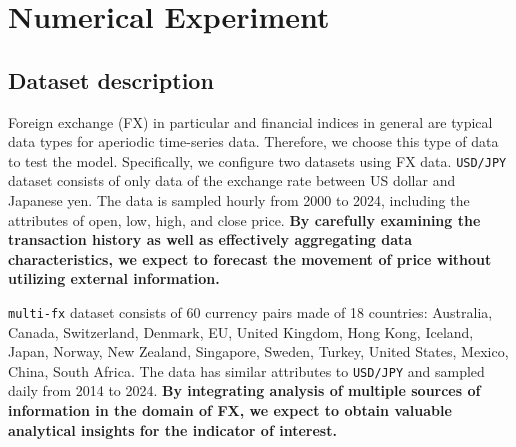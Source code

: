 
\chapter{Numerical Experiment}
\label{chap:experiment}

\section{Dataset description}


Foreign exchange (FX) in particular and financial indices in general are typical data types for aperiodic time-series data. Therefore, we choose this type of data to test the model. Specifically, we configure two datasets using FX data. \verb|USD/JPY| dataset consists of only data of the exchange rate between US dollar and Japanese yen. The data is sampled hourly from 2000 to 2024, including the attributes of open, low, high, and close price. \textbf{By carefully examining the transaction history as well as effectively aggregating data characteristics, we expect to forecast the movement of price without utilizing external information.}

\verb|multi-fx| dataset consists of 60 currency pairs made of 18 countries: Australia, Canada, Switzerland, Denmark, EU, United Kingdom, Hong Kong, Iceland, Japan, Norway, New Zealand, Singapore, Sweden, Turkey, United States, Mexico, China, South Africa. The data has similar attributes to \verb|USD/JPY| and sampled daily from 2014 to 2024. \textbf{By integrating analysis of multiple sources of information in the domain of FX, we expect to obtain valuable analytical insights for the indicator of interest.}

